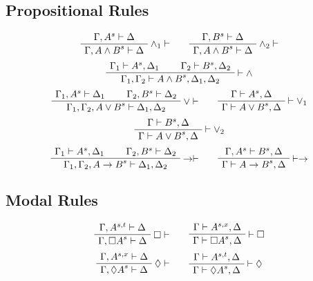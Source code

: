 \documentclass{article}
\newcommand{\seq}[2]{{#1} \vdash{} {#2}}
\newcommand{\pf}[2]{{#1}^{#2}} %
\theoremstyle{definition}
\begin{document}
\subsection*{Propositional Rules}
\[
\AxiomC{$\seq{\Gamma, \pf{A}{s}}{\Delta}$}
\RightLabel{$\wedge_1 \vdash$}
\UnaryInfC{$\seq{\Gamma, \pf{A \wedge B}{s}}{\Delta}$}
\DisplayProof
\qquad
\AxiomC{$\seq{\Gamma, \pf{B}{s}}{\Delta}$}
\RightLabel{$\wedge_2 \vdash$}
\UnaryInfC{$\seq{\Gamma, \pf{A \wedge B}{s}}{\Delta}$}
\DisplayProof
\]
\[
\AxiomC{$\seq{\Gamma_1}{\pf{A}{s}, \Delta_1}$}
\AxiomC{$\seq{\Gamma_2}{\pf{B}{s}, \Delta_2}$}
\RightLabel{$\vdash \wedge$}
\BinaryInfC{$\seq{\Gamma_1, \Gamma_2}{\pf{A \wedge B}{s}, \Delta_1, \Delta_2}$}
\DisplayProof
\]
\[
\AxiomC{$\seq{\Gamma_1, \pf{A}{s}}{\Delta_1}$}
\AxiomC{$\seq{\Gamma_2, \pf{B}{s}}{\Delta_2}$}
\RightLabel{$\vee \vdash$}
\BinaryInfC{$\seq{\Gamma_1, \Gamma_2, \pf{A \vee B}{s}}{\Delta_1, \Delta_2}$}
\DisplayProof
\qquad
\AxiomC{$\seq{\Gamma}{\pf{A}{s}, \Delta}$}
\RightLabel{$\vdash \vee_1$}
\UnaryInfC{$\seq{\Gamma}{\pf{A \vee B}{s}, \Delta}$}
\DisplayProof
\]
\[
\AxiomC{$\seq{\Gamma}{\pf{B}{s}, \Delta}$}
\RightLabel{$\vdash \vee_2$}
\UnaryInfC{$\seq{\Gamma}{\pf{A \vee B}{s}, \Delta}$}
\DisplayProof
\]
\[
\AxiomC{$\seq{\Gamma_1}{\pf{A}{s}, \Delta_1}$}
\AxiomC{$\seq{\Gamma_2, \pf{B}{s}}{\Delta_2}$}
\RightLabel{$\rightarrow \vdash$}
\BinaryInfC{$\seq{\Gamma_1, \Gamma_2, \pf{A \rightarrow B}{s}}{\Delta_1, \Delta_2}$}
\DisplayProof
\qquad
\AxiomC{$\seq{\Gamma, \pf{A}{s}}{\pf{B}{s}, \Delta}$}
\RightLabel{$\vdash \rightarrow$}
\UnaryInfC{$\seq{\Gamma}{\pf{A \rightarrow B}{s}, \Delta}$}
\DisplayProof
\]
\subsection*{Modal Rules}
\[
\AxiomC{$\seq{\Gamma, \pf{A}{s,t}}{\Delta}$}
\RightLabel{$\Box \vdash$}
\UnaryInfC{$\seq{\Gamma, \pf{\Box A}{s}}{\Delta}$}
\DisplayProof
\qquad
\AxiomC{$\seq{\Gamma}{\pf{A}{s,x}, \Delta}$}
\RightLabel{$\vdash \Box$}
\UnaryInfC{$\seq{\Gamma}{\pf{\Box A}{s}, \Delta}$}
\DisplayProof
\]
\[
\AxiomC{$\seq{\Gamma, \pf{A}{s,x}}{\Delta}$}
\RightLabel{$\Diamond \vdash$}
\UnaryInfC{$\seq{\Gamma, \pf{\Diamond A}{s}}{\Delta}$}
\DisplayProof
\qquad
\AxiomC{$\seq{\Gamma}{\pf{A}{s,t}, \Delta}$}
\RightLabel{$\vdash \Diamond$}
\UnaryInfC{$\seq{\Gamma}{\pf{\Diamond A}{s}, \Delta}$}
\DisplayProof
\]
\end{document}
